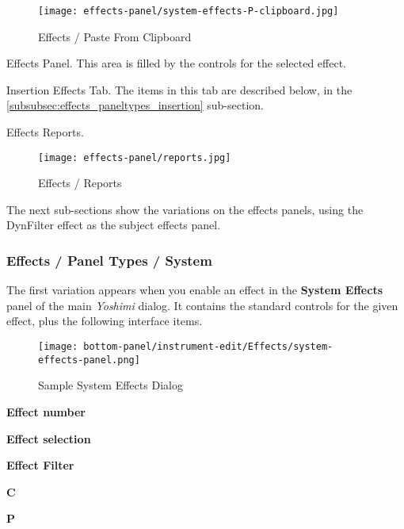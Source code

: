 \begin{figure}[H]
   \centering
   \texttt{[image: effects-panel/system-effects-P-clipboard.jpg]}
   \caption{Effects / Paste From Clipboard}
   \label{fig:effects_paste_from_clipboard}
\end{figure}

   Effects Panel.
   This area is filled by the controls for the selected effect.

   Insertion Effects Tab.
   The items in this tab are described below,
   in the \ref{subsubsec:effects_paneltypes_insertion}
   sub-section.

   Effects Reports.

\begin{figure}[H]
   \centering
   \texttt{[image: effects-panel/reports.jpg]}
   \caption{Effects / Reports}
   \label{fig:effects_reports}
\end{figure}

   The next sub-sections show the variations on the effects panels, using the
   DynFilter effect as the subject effects panel.

\subsubsection{Effects / Panel Types / System }
\label{subsubsec:effects_paneltypes_system}

   The first variation
   appears when you enable an effect in the
   \textbf{System Effects}
   panel of the main \textsl{Yoshimi} dialog.  It contains the standard
   controls for the given effect, plus the following interface items.

\begin{figure}[H]
   \centering
   \texttt{[image: bottom-panel/instrument-edit/Effects/system-effects-panel.png]}
   \caption{Sample System Effects Dialog}
   \label{fig:sample_system_effects_dialog}
\end{figure}

   \begin{enumber}
      \item \textbf{Effect number}
      \item \textbf{Effect selection}
      \item \textbf{Effect Filter}
      \item \textbf{C}
      \item \textbf{P}
   \end{enumber}

